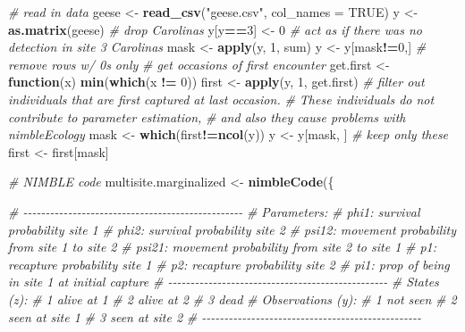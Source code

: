 \documentclass[
  12pt,
]{krantz}
\newenvironment{Shaded}{\begin{snugshade}}{\end{snugshade}}
\newcommand{\AttributeTok}[1]{\textcolor[rgb]{0.13,0.29,0.53}{#1}}
\newcommand{\CommentTok}[1]{\textcolor[rgb]{0.56,0.35,0.01}{\textit{#1}}}
\newcommand{\ConstantTok}[1]{\textcolor[rgb]{0.56,0.35,0.01}{#1}}
\newcommand{\ControlFlowTok}[1]{\textcolor[rgb]{0.13,0.29,0.53}{\textbf{#1}}}
\newcommand{\DecValTok}[1]{\textcolor[rgb]{0.00,0.00,0.81}{#1}}
\newcommand{\FunctionTok}[1]{\textcolor[rgb]{0.13,0.29,0.53}{\textbf{#1}}}
\newcommand{\NormalTok}[1]{#1}
\newcommand{\OtherTok}[1]{\textcolor[rgb]{0.56,0.35,0.01}{#1}}
\newcommand{\SpecialCharTok}[1]{\textcolor[rgb]{0.81,0.36,0.00}{\textbf{#1}}}
\newcommand{\StringTok}[1]{\textcolor[rgb]{0.31,0.60,0.02}{#1}}
\begin{document}
\begin{Shaded}
\begin{Highlighting}[]
\CommentTok{\# read in data}
\NormalTok{geese }\OtherTok{\textless{}{-}} \FunctionTok{read\_csv}\NormalTok{(}\StringTok{"geese.csv"}\NormalTok{, }\AttributeTok{col\_names =} \ConstantTok{TRUE}\NormalTok{)}
\NormalTok{y }\OtherTok{\textless{}{-}} \FunctionTok{as.matrix}\NormalTok{(geese)}
\CommentTok{\# drop Carolinas}
\NormalTok{y[y}\SpecialCharTok{==}\DecValTok{3}\NormalTok{] }\OtherTok{\textless{}{-}} \DecValTok{0} \CommentTok{\# act as if there was no detection in site 3 Carolinas}
\NormalTok{mask }\OtherTok{\textless{}{-}} \FunctionTok{apply}\NormalTok{(y, }\DecValTok{1}\NormalTok{, sum)}
\NormalTok{y }\OtherTok{\textless{}{-}}\NormalTok{ y[mask}\SpecialCharTok{!=}\DecValTok{0}\NormalTok{,] }\CommentTok{\# remove rows w/ 0s only}
\CommentTok{\# get occasions of first encounter}
\NormalTok{get.first }\OtherTok{\textless{}{-}} \ControlFlowTok{function}\NormalTok{(x) }\FunctionTok{min}\NormalTok{(}\FunctionTok{which}\NormalTok{(x }\SpecialCharTok{!=} \DecValTok{0}\NormalTok{))}
\NormalTok{first }\OtherTok{\textless{}{-}} \FunctionTok{apply}\NormalTok{(y, }\DecValTok{1}\NormalTok{, get.first)}
\CommentTok{\# filter out individuals that are first captured at last occasion. }
\CommentTok{\# These individuals do not contribute to parameter estimation, }
\CommentTok{\# and also they cause problems with nimbleEcology}
\NormalTok{mask }\OtherTok{\textless{}{-}} \FunctionTok{which}\NormalTok{(first}\SpecialCharTok{!=}\FunctionTok{ncol}\NormalTok{(y)) }
\NormalTok{y }\OtherTok{\textless{}{-}}\NormalTok{ y[mask, ]                }\CommentTok{\# keep only these}
\NormalTok{first }\OtherTok{\textless{}{-}}\NormalTok{ first[mask]}

\CommentTok{\# NIMBLE code }
\NormalTok{multisite.marginalized }\OtherTok{\textless{}{-}} \FunctionTok{nimbleCode}\NormalTok{(\{}
  
  \CommentTok{\# {-}{-}{-}{-}{-}{-}{-}{-}{-}{-}{-}{-}{-}{-}{-}{-}{-}{-}{-}{-}{-}{-}{-}{-}{-}{-}{-}{-}{-}{-}{-}{-}{-}{-}{-}{-}{-}{-}{-}{-}{-}{-}{-}{-}{-}{-}{-}{-}{-}}
  \CommentTok{\# Parameters:}
  \CommentTok{\# phi1: survival probability site 1}
  \CommentTok{\# phi2: survival probability site 2}
  \CommentTok{\# psi12: movement probability from site 1 to site 2}
  \CommentTok{\# psi21: movement probability from site 2 to site 1}
  \CommentTok{\# p1: recapture probability site 1}
  \CommentTok{\# p2: recapture probability site 2}
  \CommentTok{\# pi1: prop of being in site 1 at initial capture}
  \CommentTok{\# {-}{-}{-}{-}{-}{-}{-}{-}{-}{-}{-}{-}{-}{-}{-}{-}{-}{-}{-}{-}{-}{-}{-}{-}{-}{-}{-}{-}{-}{-}{-}{-}{-}{-}{-}{-}{-}{-}{-}{-}{-}{-}{-}{-}{-}{-}{-}{-}{-}}
  \CommentTok{\# States (z):}
  \CommentTok{\# 1 alive at 1}
  \CommentTok{\# 2 alive at 2}
  \CommentTok{\# 3 dead}
  \CommentTok{\# Observations (y):  }
  \CommentTok{\# 1 not seen}
  \CommentTok{\# 2 seen at site 1 }
  \CommentTok{\# 3 seen at site 2}
  \CommentTok{\# {-}{-}{-}{-}{-}{-}{-}{-}{-}{-}{-}{-}{-}{-}{-}{-}{-}{-}{-}{-}{-}{-}{-}{-}{-}{-}{-}{-}{-}{-}{-}{-}{-}{-}{-}{-}{-}{-}{-}{-}{-}{-}{-}{-}{-}{-}{-}{-}{-}}
  

\end{Highlighting}
\end{Shaded}
\end{document}
